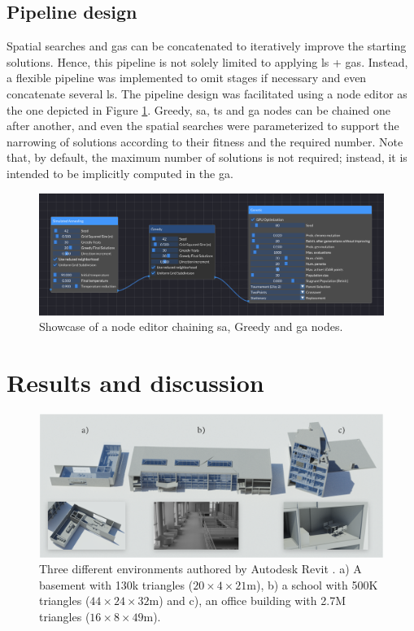 \subsection{Pipeline design}

Spatial searches and \acrshort{ga}s can be concatenated to iteratively improve the starting solutions. Hence, this pipeline is not solely limited to applying \acrshort{ls} + \acrshort{ga}s. Instead, a flexible pipeline was implemented to omit stages if necessary and even concatenate several \acrshort{ls}. The pipeline design was facilitated using a node editor as the one depicted in Figure \ref{fig:optimization_node_editor}. Greedy, \acrshort{sa}, \acrshort{ts} and \acrshort{ga} nodes can be chained one after another, and even the spatial searches were parameterized to support the narrowing of solutions according to their fitness and the required number. Note that, by default, the maximum number of solutions is not required; instead, it is intended to be implicitly computed in the \acrshort{ga}.

\begin{figure}[ht]
    \centering
    \includegraphics[width=\linewidth]{figs/lidar_optimization/optimization_node_editor.png}
	\caption{Showcase of a node editor chaining \acrshort{sa}, Greedy and \acrshort{ga} nodes. }
	\label{fig:optimization_node_editor}
\end{figure}

\section{Results and discussion}

\begin{figure}
    \centering
    \includegraphics[width=\linewidth]{figs/lidar_optimization/evaluation_scenes.png}
	\caption{Three different environments authored by Autodesk Revit \textregistered \hspace{.5mm}. a) A basement with 130k triangles ($20 \times 4 \times 21$\si{\meter}), b) a school with 500K triangles ($44 \times 24 \times 32$\si{\meter}) and c), an office building with 2.7M triangles ($16 \times 8 \times 49$\si{\meter}). }
	\label{fig:bim_environments}
\end{figure}

